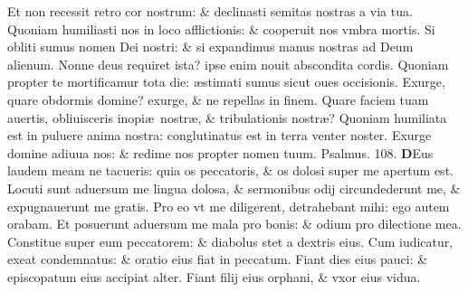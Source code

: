 \documentclass[a5paper,10pt]{book}
\def\ae{æ}
\begin{document}
\begin{multicols*}{2}
\newline \color{red} E\color{black}t non recessit retro cor nostrum: \& declinasti semitas nostras a via tua.
\newline \color{red} Q\color{black}uoniam humiliasti nos in loco afflictionis: \& cooperuit nos vmbra mortis.
\newline \color{red} S\color{black}i obliti sumus nomen Dei nostri: \& si expandimus manus nostras ad Deum alienum.
\newline \color{red} N\color{black}onne deus requiret ista? ipse enim nouit abscondita cordis.
\newline \color{red} Q\color{black}uoniam propter te mortificamur tota die: \ae stimati sumus sicut oues occisionis.
\newline \color{red} E\color{black}xurge, quare obdormis domine? exurge, \& ne repellas in finem.
\newline \color{red} Q\color{black}uare faciem tuam auertis, obliuisceris inopi\ae \ nostr\ae , \& tribulationis nostr\ae ?
\newline \color{red} Q\color{black}uoniam humiliata est in puluere anima nostra: conglutinatus est in terra venter noster.
\newline \color{red} E\color{black}xurge domine adiuua nos: \& redime nos propter nomen tuum.
\newline \color{red} Psalmus. 108. \color{black}
\vspace{-1em}
\lettrine[lines=2]{\bfseries \color{red} D}{}Eus laudem meam ne tacueris: quia os peccatoris, \& os dolosi super me apertum est.
\newline \color{red} L\color{black}ocuti sunt aduersum me lingua dolosa, \& sermonibus odij circundederunt me, \& expugnauerunt me gratis.
\newline \color{red} P\color{black}ro eo vt me diligerent, detrahebant mihi: ego autem orabam.
\newline \color{red} E\color{black}t posuerunt aduersum me mala pro bonis: \& odium pro dilectione mea.
\newline \color{red} C\color{black}onstitue super eum peccatorem: \& diabolus stet a dextris eius.
\newline \color{red} C\color{black}um iudicatur, exeat condemnatus: \& oratio eius fiat in peccatum.
\newline \color{red} F\color{black}iant dies eius pauci: \& episcopatum eius accipiat alter.
\newline \color{red} F\color{black}iant filij eius orphani, \& vxor eius vidua.

\end{multicols*}
\end{document}
